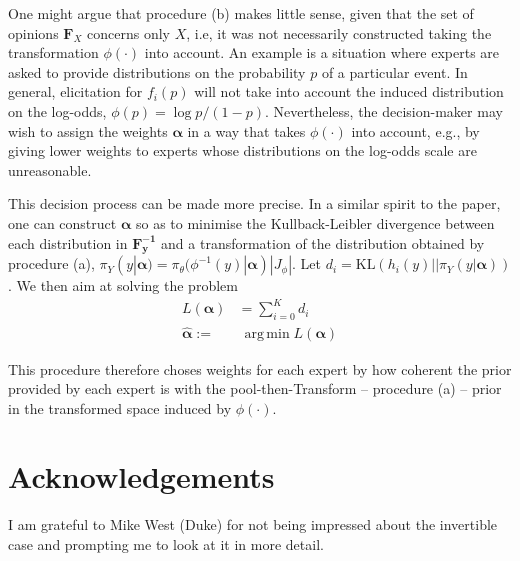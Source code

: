 \documentclass[a4paper, notitlepage, 10pt]{article}
\DeclareMathOperator*{\argmin}{arg\,min}
\begin{document}
One might argue that procedure (b) makes little sense, given that the set of opinions $\mathbf{F}_{X}$ concerns only $X$, i.e, it was not necessarily constructed taking the transformation $\phi(\cdot)$ into account.
An example is a situation where experts are asked to provide distributions on the probability $p$ of a particular event.
In general, elicitation for $f_i(p)$ will not take into account the induced distribution on the log-odds, $\phi(p) = \log p/(1-p)$.
Nevertheless, the decision-maker may wish to assign the weights $\boldsymbol\alpha$ in a way that takes $\phi(\cdot)$ into account, e.g., by giving lower weights to experts whose distributions on the log-odds scale are unreasonable.

This decision process can be made more precise.
In a similar spirit to the paper, one can construct $\boldsymbol\alpha$ so as to minimise the Kullback-Leibler divergence between each distribution in $\mathbf{F^{-1}_y}$ and a transformation of the distribution obtained by procedure (a), $\pi_{Y}(y | \boldsymbol\alpha) = \pi_{\theta}( \phi^{-1}(y)| \boldsymbol\alpha)|J_\phi|$.
Let $d_i = \text{KL}( h_i(y) || \pi_{Y}(y | \boldsymbol\alpha))$.
We then aim at solving the problem
\begin{align}
L(\boldsymbol\alpha) &= \sum_{i=0}^Kd_i \\
     \hat{\boldsymbol\alpha}:=& \:\argmin L(\boldsymbol\alpha)  \nonumber
\end{align}

This procedure therefore choses weights for each expert by how coherent the prior provided by each expert is with the pool-then-Transform -- procedure (a) -- prior in the transformed space induced by $\phi(\cdot)$.


\section*{Acknowledgements}

I am grateful to Mike West (Duke) for not being impressed about the invertible case and prompting me to look at it in more detail.


\end{document}
